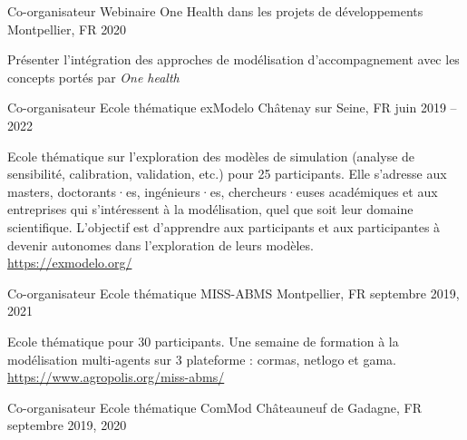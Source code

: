 \begin{cventries}
      \cventry
        {Co-organisateur} %
        {Webinaire One Health dans les projets de développements} %
        {Montpellier, FR} %
        {2020} %
        {
          \begin{cvitems} %
            Présenter l'intégration des approches de modélisation d'accompagnement avec les concepts portés par \textit{One health}
          \end{cvitems}
        }

    \cventry
      {Co-organisateur} %
      {Ecole thématique exModelo} %
      {Châtenay sur Seine, FR} %
      {juin 2019 -- 2022} %
      {
        \begin{cvitems} %
          Ecole thématique sur l’exploration des modèles de simulation (analyse de sensibilité, calibration, validation, etc.) pour 25 participants. Elle s’adresse aux masters, doctorants·es, ingénieurs·es, chercheurs·euses académiques et aux entreprises qui s’intéressent à la modélisation, quel que soit leur domaine scientifique. L’objectif est d’apprendre aux participants et aux participantes à devenir autonomes dans l’exploration de leurs modèles.\\
          \url{https://exmodelo.org/}
          \end{cvitems}
      }
    \cventry
      {Co-organisateur} %
      {Ecole thématique MISS-ABMS} %
      {Montpellier, FR} %
      {septembre 2019, 2021} %
      {
      \begin{cvitems} %
        Ecole thématique pour 30 participants. Une semaine de formation à la modélisation multi-agents sur 3 plateforme : cormas, netlogo et gama.\\
        \url{https://www.agropolis.org/miss-abms/}
      \end{cvitems}
      }
    \cventry
      {Co-organisateur} %
      {Ecole thématique ComMod} %
      {Châteauneuf de Gadagne, FR} %
      {septembre 2019, 2020} %
      {
      \begin{cvitems} %

\end{cvitems}}
\end{cventries}
